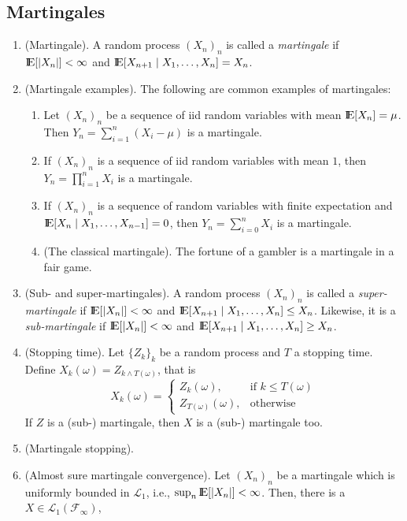 \documentclass[a4paper,10pt]{article}
\begin{document}
\subsection{Martingales}

\begin{enumerate}
 \item (Martingale). A random process $(X_n)_n$ is called a \textit{martingale} if 
		     $\E[|X_n|]<\infty$ and $\E[X_{n+1}{}\mid{}X_1,\ldots, X_n]=X_{n}$.
 \item (Martingale examples). The following are common examples of martingales:
  \begin{enumerate}
   \item Let $(X_n)_n$ be a sequence of iid random variables with mean $\E[X_n]=\mu$. Then
         $Y_n = \sum_{i=1}^{n}(X_i-\mu)$ is a martingale.
   \item If $(X_n)_n$ is a sequence of iid random variables with mean $1$, then 
         $Y_n = \prod_{i=1}^{n}X_i$ is a martingale.
   \item If $(X_n)_n$ is a sequence of random variables with finite expectation and 
         $\E[X_n{}\mid{}X_1,\ldots,X_{n-1}]=0$, then $Y_n=\sum_{i=0}^{n}X_i$ is a 
         martingale.
   \item (The classical martingale). The fortune of a gambler is a martingale in a fair game.
  \end{enumerate}
 \item (Sub- and super-martingales). A random process $(X_n)_n$ is called a \textit{super-martingale} if 
		     $\E[|X_n|]<\infty$ and $\E[X_{n+1}{}\mid{}X_1,\ldots, X_n]\leq X_{n}$. Likewise, it 
		     is a \textit{sub-martingale} if $\E[|X_n|]<\infty$ and $\E[X_{n+1}{}\mid{}X_1,\ldots, X_n]\geq X_{n}$.
 \item (Stopping time). Let $\{Z_k\}_k$ be a random process and $T$ a stopping time. 
       Define $X_k(\omega) = Z_{k\wedge T(\omega)}$, that is
       \[
        X_k(\omega) = \begin{cases}
                       Z_k(\omega),&\text{if }k \leq T(\omega)\\
                       Z_{T(\omega)}(\omega),&\text{otherwise}
                      \end{cases}
       \]
       If $Z$ is a (sub-) martingale, then $X$ is a (sub-) martingale too.
 \item (Martingale stopping).
 \item (Almost sure martingale convergence). Let $(X_n)_n$ be a martingale which is uniformly 
       bounded in $\mathcal{L}_1$, i.e., $\sup_n \E[|X_n|] < \infty$. Then, there is a $X\in\mathcal{L}_1(\mathcal{F}_\infty)$,

\end{enumerate}
\end{document}
